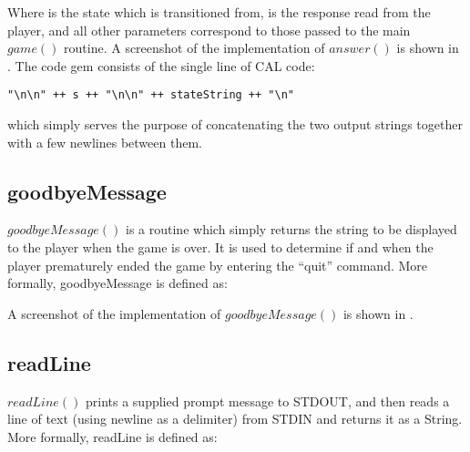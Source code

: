 Where  is the state which is transitioned from,  is the response read from the player, and all other parameters correspond to those passed to the main \(game()\) routine.  A screenshot of the implementation of \(answer()\) is shown in .  The  code gem consists of the single line of CAL code:

\begin{verbatim}
"\n\n" ++ s ++ "\n\n" ++ stateString ++ "\n"
\end{verbatim}

which simply serves the purpose of concatenating the two output strings together with a few newlines between them.


\subsection{goodbyeMessage}

\(goodbyeMessage()\) is a routine which simply returns the string to be displayed to the player when the game is over.  It is used to determine if and when the player prematurely ended the game by entering the ``quit'' command.  More formally, goodbyeMessage is defined as:


A screenshot of the implementation of \(goodbyeMessage()\) is shown in .


\subsection{readLine}

\(readLine()\) prints a supplied prompt message to STDOUT, and then reads a line of text (using newline as a delimiter) from STDIN and returns it as a String.  More formally, readLine is defined as:


